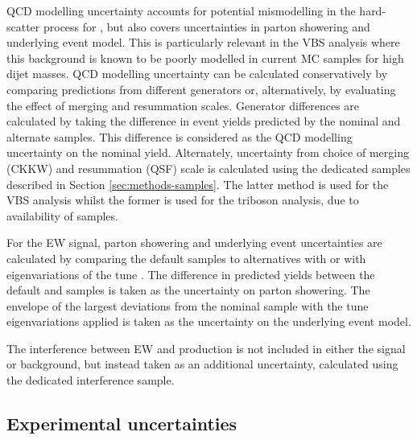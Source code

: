\ac{QCD} modelling uncertainty accounts for potential mismodelling in the
hard-scatter process for \QCDZy, but also covers uncertainties in parton
showering and underlying event model. This is particularly relevant in the \ac{VBS}
\Zy analysis where this background is known to be poorly modelled in current
\ac{MC} samples for high dijet masses.
\ac{QCD} modelling uncertainty can be calculated conservatively by comparing
predictions from different generators or, alternatively, by evaluating the
effect of merging and resummation scales. Generator differences are calculated
by taking the difference in event yields predicted by the nominal and alternate
\QCDZy samples. This difference is considered as the \ac{QCD} modelling
uncertainty on the nominal yield.
Alternately, uncertainty from choice of merging (CKKW) and
resummation (QSF) scale is calculated using the dedicated samples described in
Section \ref{sec:methods-samples}. The latter method is used for the \ac{VBS}
analysis whilst the former is used for the triboson analysis, due to
availability of samples.

For the \ac{EW} signal, parton showering and underlying event uncertainties are
calculated by comparing the default \pythia samples to alternatives with \herwig
or with eigenvariations of the \pythia tune \cite{A14tune}.  The difference in
predicted yields between the default and \herwig samples is taken as the
uncertainty on parton showering. The envelope of the largest deviations from the
nominal sample with the tune eigenvariations applied is taken as the uncertainty
on the underlying event model.

The interference between \ac{EW} and \QCDZy production is not included in
either the signal or background, but instead taken as an additional uncertainty,
calculated using the dedicated interference sample.

\subsection{Experimental uncertainties}

